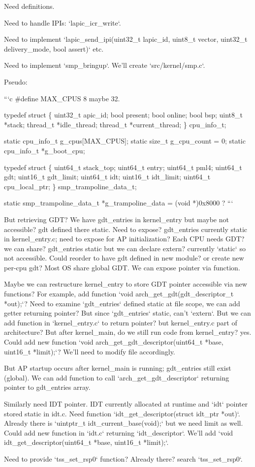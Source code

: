 \begin{decodedreasoningpanel}
Need definitions.

Need to handle IPIs: `lapic\_icr\_write`.

Need to implement `lapic\_send\_ipi(uint32\_t lapic\_id, uint8\_t vector, uint32\_t delivery\_mode, bool assert)` etc.

Need to implement `smp\_bringup`. We'll create `src/kernel/smp.c`.

Pseudo:

```c
\#define MAX\_CPUS 8 maybe 32.

typedef struct
\{
    uint32\_t apic\_id;
    bool present;
    bool online;
    bool bsp;
    uint8\_t *stack;
    thread\_t *idle\_thread;
    thread\_t *current\_thread;
\} cpu\_info\_t;

static cpu\_info\_t g\_cpus[MAX\_CPUS];
static size\_t g\_cpu\_count = 0;
static cpu\_info\_t *g\_boot\_cpu;

typedef struct
\{
    uint64\_t stack\_top;
    uint64\_t entry;
    uint64\_t pml4;
    uint64\_t gdt;
    uint16\_t gdt\_limit;
    uint64\_t idt;
    uint16\_t idt\_limit;
    uint64\_t cpu\_local\_ptr;
\} smp\_trampoline\_data\_t;

static smp\_trampoline\_data\_t *g\_trampoline\_data = (void *)0x8000 ?
```

But retrieving GDT? We have gdt\_entries in kernel\_entry but maybe not accessible? gdt defined there static. Need to expose? gdt\_entries currently static in kernel\_entry.c; need to expose for AP initialization? Each CPU needs GDT? we can share? gdt\_entries static but we can declare extern? currently `static` so not accessible. Could reorder to have gdt defined in new module? or create new per-cpu gdt? Most OS share global GDT. We can expose pointer via function.

Maybe we can restructure kernel\_entry to store GDT pointer accessible via new functions? For example, add function `void arch\_get\_gdt(gdt\_descriptor\_t *out);`? Need to examine `gdt\_entries` defined static at file scope, we can add getter returning pointer? But since `gdt\_entries` static, can't `extern`. But we can add function in `kernel\_entry.c` to return pointer? but kernel\_entry.c part of architecture? But after kernel\_main, do we still run code from kernel\_entry? yes. Could add new function `void arch\_get\_gdt\_descriptor(uint64\_t *base, uint16\_t *limit);`? We'll need to modify file accordingly.

But AP startup occurs after kernel\_main is running; gdt\_entries still exist (global). We can add function to call `arch\_get\_gdt\_descriptor` returning pointer to gdt\_entries array.

Similarly need IDT pointer. IDT currently allocated at runtime and `idt` pointer stored static in idt.c. Need function `idt\_get\_descriptor(struct idt\_ptr *out)`. Already there is `uintptr\_t idt\_current\_base(void);` but we need limit as well. Could add new function in `idt.c` returning `idt\_descriptor`. We'll add `void idt\_get\_descriptor(uint64\_t *base, uint16\_t *limit);`.

Need to provide `tss\_set\_rsp0` function? Already there? search `tss\_set\_rsp0`.
\end{decodedreasoningpanel}
